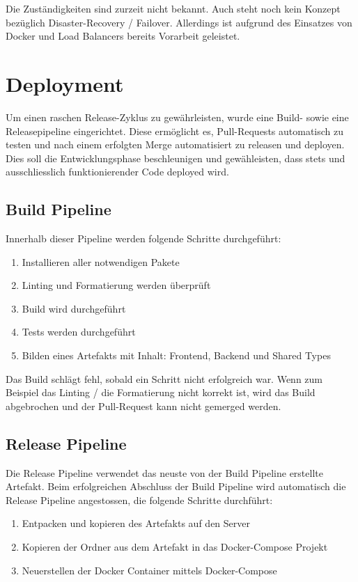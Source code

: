 \documentclass[11pt,a4paper,german]{scrartcl}
\let\oldsection\section
\renewcommand\section{\clearpage\oldsection}
\begin{document}
Die Zuständigkeiten sind zurzeit nicht bekannt. Auch steht noch kein Konzept bezüglich Disaster-Recovery / Failover. Allerdings ist aufgrund des Einsatzes von Docker und Load Balancers bereits Vorarbeit geleistet.

\section{Deployment}

Um einen raschen Release-Zyklus zu gewährleisten, wurde eine Build- sowie eine Releasepipeline eingerichtet.
Diese ermöglicht es, Pull-Requests automatisch zu testen und nach einem erfolgten Merge automatisiert zu releasen und deployen.
Dies soll die Entwicklungsphase beschleunigen und gewähleisten, dass stets und ausschliesslich funktionierender Code deployed wird.

\subsection{Build Pipeline}
Innerhalb dieser Pipeline werden folgende Schritte durchgeführt:
\begin{enumerate}
  \item Installieren aller notwendigen Pakete
  \item Linting und Formatierung werden überprüft
  \item Build wird durchgeführt
  \item Tests werden durchgeführt
  \item Bilden eines Artefakts mit Inhalt: Frontend, Backend und Shared Types
\end{enumerate}
Das Build schlägt fehl, sobald ein Schritt nicht erfolgreich war. Wenn zum Beispiel das Linting / die Formatierung nicht korrekt ist, wird das Build abgebrochen und der Pull-Request kann nicht gemerged werden.

\subsection{Release Pipeline}
Die Release Pipeline verwendet das neuste von der Build Pipeline erstellte Artefakt. Beim erfolgreichen Abschluss der Build Pipeline wird automatisch die Release Pipeline angestossen, die folgende Schritte durchführt:
\begin{enumerate}
  \item Entpacken und kopieren des Artefakts auf den Server
  \item Kopieren der Ordner aus dem Artefakt in das Docker-Compose Projekt
  \item Neuerstellen der Docker Container mittels Docker-Compose
\end{enumerate}
\end{document}
